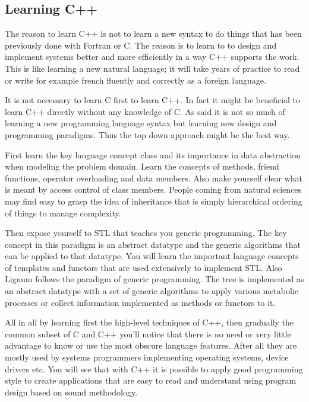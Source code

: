 \subsection{Learning C++} 

The reason to learn C++ is not to learn a new syntax to do things that
has been previously done with Fortran  or C. The reason is to learn to
to design and  implement systems better and more  efficiently in a way
C++ supports the work.  This  is like learning a new natural language;
it will  take years of  practice to read  or write for  example french
fluently and correctly as a foreign language.

It is not necessary to learn C first to learn C++. In fact it might be
beneficial to learn  C++ directly without any knowledge  of C. As said
it is  not so much of  learning a new programming  language syntax but
learning  new design  and programming  paradigms.  Thus  the  top down
approach might be the best  way.  

First learn the key language  concept class and its importance in data
abstraction when  modeling the problem domain.  Learn  the concepts of
methods, friend functions, operator overloading and data members. Also
make yourself clear what is  meant by access control of class members.
People coming from natural sciences may find easy to grasp the idea of
inheritance that  is simply hierarchical ordering of  things to manage
complexity.

Then expose yourself to STL that teaches you generic programming.  The
key concept in  this paradigm is an abstract  datatype and the generic
algorithms that can  be applied to that datatype.   You will learn the
important language  concepts of templates  and functors that  are used
extensively  to implement  STL. Also  Lignum follows  the  paradigm of
generic programming.  The tree is implemented as  an abstract datatype
with a set of generic  algorithms to apply various metabolic processes
or collect information implemented as methods or functors to it.

All in  all by learning first  the high-level techniques  of C++, then
gradually the common  subset of C and C++ you'll  notice that there is
no  need or  very little  advantage to  know or  use the  most obscure
language  features.   After  all  they  are  mostly  used  by  systems
programmers  implementing operating systems,  device drivers  etc. You
will see that with C++ it  is possible to apply good programming style
to  create applications  that are  easy to  read and  understand using
program design based on sound methodology.
   
